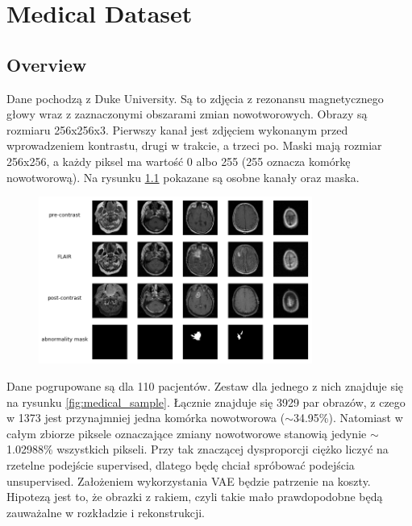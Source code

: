 \chapter{Medical Dataset}

\section{Overview}

Dane pochodzą z Duke University. Są to zdjęcia z rezonansu magnetycznego głowy wraz z zaznaczonymi obszarami zmian nowotworowych. Obrazy są rozmiaru 256x256x3. Pierwszy kanał jest zdjęciem wykonanym przed wprowadzeniem kontrastu, drugi w trakcie, a trzeci po. Maski mają rozmiar 256x256, a każdy piksel ma wartość 0 albo 255 (255 oznacza komórkę nowotworową). Na rysunku \ref{fig:medical_description} pokazane są osobne kanały oraz maska.

\begin{figure}[h!]
    \centering
    \includegraphics[width=0.8\textwidth]{images/medical_description}
    \caption{}
    \label{fig:medical_description}
\end{figure}

Dane pogrupowane są dla 110 pacjentów. Zestaw dla jednego z nich znajduje się na rysunku \ref{fig:medical_sample}. Łącznie znajduje się 3929 par obrazów, z czego w 1373 jest przynajmniej jedna komórka nowotworowa ($\sim$34.95\%). Natomiast w całym zbiorze piksele oznaczające zmiany nowotworowe stanowią jedynie $\sim$1.02988\% wszystkich pikseli. Przy tak znaczącej dysproporcji ciężko liczyć na rzetelne podejście supervised, dlatego będę chciał spróbować podejścia unsupervised. Założeniem wykorzystania VAE będzie patrzenie na koszty. Hipotezą jest to, że obrazki z rakiem, czyli takie mało prawdopodobne będą zauważalne w rozkładzie i rekonstrukcji.

